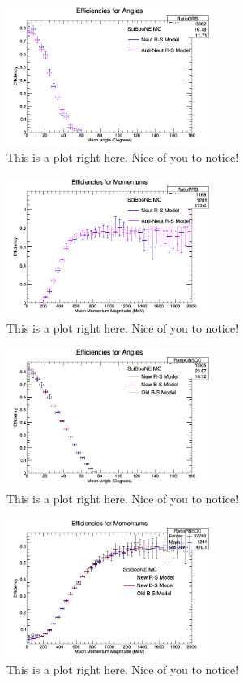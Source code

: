 \documentclass[11pt]{article}
\begin{document}
\begin{figure}[H]
\centering
\includegraphics[width=0.6\textwidth]{NMCombinedPlotsImages/20-NMCombinedPlots.png}
\caption{This is a plot right here. Nice of you to notice!}
\end{figure}

\begin{figure}[H]
\centering
\includegraphics[width=0.6\textwidth]{NMCombinedPlotsImages/21-NMCombinedPlots.png}
\caption{This is a plot right here. Nice of you to notice!}
\end{figure}

\begin{figure}[H]
\centering
\includegraphics[width=0.6\textwidth]{NMCombinedPlotsImages/22-NMCombinedPlots.png}
\caption{This is a plot right here. Nice of you to notice!}
\end{figure}

\begin{figure}[H]
\centering
\includegraphics[width=0.6\textwidth]{NMCombinedPlotsImages/23-NMCombinedPlots.png}
\caption{This is a plot right here. Nice of you to notice!}
\end{figure}
\end{document}
